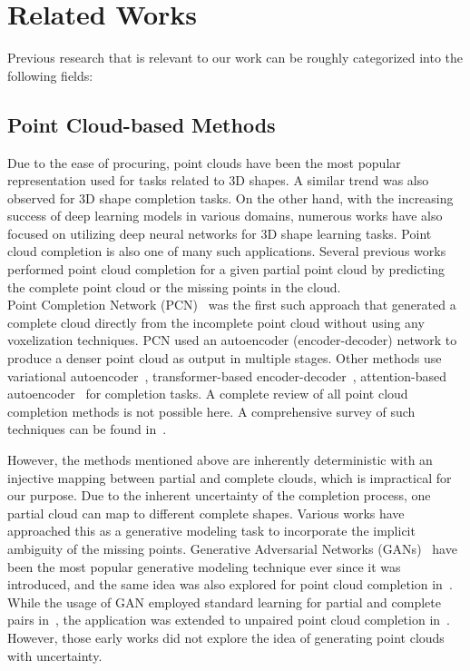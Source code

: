 \chapter{Related Works}\label{ch:related-work}
Previous research that is relevant to our work can be roughly categorized into the following fields:



\section{Point Cloud-based Methods}\label{PCC-old}
Due to the ease of procuring, point clouds have been the most popular representation used for tasks related to 3D shapes. A similar trend was also observed for 3D shape completion tasks. On the other hand, with the increasing success of deep learning models in various domains, numerous works have also focused on utilizing deep neural networks for 3D shape learning tasks. Point cloud completion is also one of many such applications. Several previous works~\cite{PCN, PoinTr, PointAttN, VarPCN, PCNSkip, Snowflake} performed point cloud completion for a given partial point cloud by predicting the complete point cloud or the missing points in the cloud. 
\\
Point Completion Network (PCN)~\cite{PCN} was the first such approach that generated a complete cloud directly from the incomplete point cloud without using any voxelization techniques. PCN used an autoencoder (encoder-decoder) network to produce a denser point cloud as output in multiple stages. Other methods use variational autoencoder~\cite{VarPCN}, transformer-based encoder-decoder~\cite{PoinTr, Snowflake}, attention-based autoencoder~\cite{PointAttN, VarPCN, PCNSkip} for completion tasks. A complete review of all point cloud completion methods is not possible here. A comprehensive survey of such techniques can be found in~\cite{PCNSurvey}. 
\newline

However, the methods mentioned above are inherently deterministic with an injective mapping between partial and complete clouds, which is impractical for our purpose. Due to the inherent uncertainty of the completion process, one partial cloud can map to different complete shapes. Various works have approached this as a generative modeling task to incorporate the implicit ambiguity of the missing points. Generative Adversarial Networks (GANs)~\cite{GAN} have been the most popular generative modeling technique ever since it was introduced, and the same idea was also explored for point cloud completion in~\cite{GANPCC1, GANUPCC}. While the usage of GAN employed standard learning for partial and complete pairs in~\cite{GANPCC1}, the application was extended to unpaired point cloud completion in~\cite{GANUPCC}. However, those early works did not explore the idea of generating point clouds with uncertainty. 
\newline

